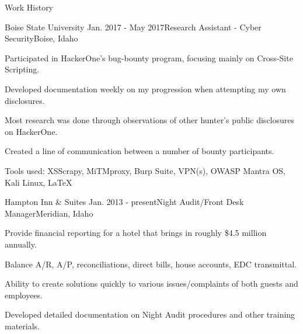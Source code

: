 \documentclass{resume}
\begin{document}
\begin{rSection}{Work History}

\begin{rSubsection}{Boise State University}
{Jan. 2017 - May 2017}{Research Assistant - Cyber Security}{Boise, Idaho}
\item Participated in HackerOne's bug-bounty program, focusing mainly on Cross-Site Scripting.
\item Developed documentation weekly on my progression when attempting
my own disclosures.
\item Most research was done through observations of other hunter's public disclosures on HackerOne.
\item Created a line of communication between a number of bounty participants. 
\item Tools used: XSScrapy, MiTMproxy, Burp Suite, VPN(s), OWASP Mantra OS, Kali Linux, \LaTeX{}

\end{rSubsection}  

\begin{rSubsection}{Hampton Inn \& Suites}
{Jan. 2013 - present}{Night Audit/Front Desk Manager}{Meridian, Idaho}
\item Provide financial reporting for a hotel that brings in roughly \$4.5 million annually.
\item Balance A/R, A/P, reconciliations, direct bills, house accounts, EDC transmittal.
\item Ability to create solutions quickly to various issues/complaints of both guests and employees. 
\item Developed detailed documentation on Night Audit procedures and other training materials.
\end{rSubsection}

\end{rSection}

\end{document}

